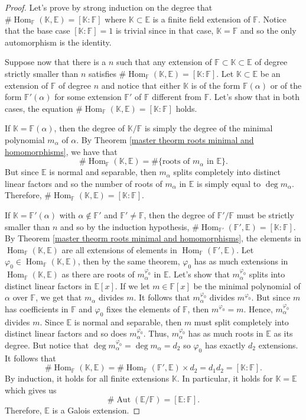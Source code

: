 \documentclass{article}
\theoremstyle{plain}
\theoremstyle{definition}
\newcommand{\F}{\mathbb{F}}
\newcommand{\E}{\mathbb{E}}
\newcommand{\K}{\mathbb{K}}
\DeclareMathOperator{\Aut}{Aut}
\DeclareMathOperator{\Hom}{Hom}
\begin{document}
\begin{proof}
    Let's prove by strong induction on the degree that $\# \Hom_{\F}(\K, \E) = [\K : \F]$ where $\K \subset \E$ is a finite field extension of $\F$. Notice that the base case $[\K : \F] = 1$ is trivial since in that case, $\K = \F$ and so the only automorphism is the identity. 
    
    Suppose now that there is a $n$ such that any extension of $\F \subset \K \subset \E$ of degree strictly smaller than $n$ satisfies $\# \Hom_{\F}(\K, \E) = [\K : \F]$. Let $\K \subset \E$ be an extension of $\F$ of degree $n$ and notice that either $\K$ is of the form $\F(\alpha)$ or of the form $\F'(\alpha)$ for some extension $\F'$ of $\F$ different from $\F$. Let's show that in both cases, the equation $\# \Hom_{\F}(\K, \E) = [\K : \F]$ holds.
    
    If $\K = \F(\alpha)$, then the degree of $\K / \F$ is simply the degree of the minimal polynomial $m_{\alpha}$ of $\alpha$. By Theorem \ref{master theorm roots minimal and homomorphisms}, we have that 
    $$\# \Hom_{\F}(\K, \E) = \#\{\text{roots of } m_{\alpha} \text{ in } \E\}.$$
    But since $\E$ is normal and separable, then $m_{\alpha}$ splits completely into distinct linear factors and so the number of roots of $m_{\alpha}$ in $\E$ is simply equal to $\deg m_{\alpha}$. Therefore, $\# \Hom_{\F}(\K, \E) = [\K : \F]$.

    If $\K = \F'(\alpha)$ with $\alpha \notin \F'$ and $\F' \neq \F$, then the degree of $\F'/\F$ must be strictly smaller than $n$ and so by the induction hypothesis, $\# \Hom_{\F'}(\F', \E) = [\K : \F]$. By Theorem \ref{master theorm roots minimal and homomorphisms}, the elements in $\Hom_{\F}(\K, \E)$ are all extensions of elements in $\Hom_{\F}(\F', \E)$. Let $\varphi_0 \in \Hom_{\F}(\K, \E)$, then by the same theorem, $\varphi_0$ has as much extensions in $\Hom_{\F}(\K, \E)$ as there are roots of $m_{\alpha}^{\varphi_0}$ in $\E$. Let's show that $m_{\alpha}^{\varphi_0}$ splits into distinct linear factors in $\E[x]$. If we let $m \in \F[x]$ be the minimal polynomial of $\alpha$ over $\F$, we get that $m_{\alpha}$ divides $m$. It follows that $m_{\alpha}^{\varphi_0}$ divides $m^{\varphi_0}$. But since $m$ has coefficients in $\F$ and $\varphi_0$ fixes the elements of $\F$, then $m^{\varphi_0} = m$. Hence, $m_{\alpha}^{\varphi_0}$ divides $m$. Since $\E$ is normal and separable, then $m$ must split completely into distinct linear factors and so does $m_{\alpha}^{\varphi_0}$. Thus, $m_{\alpha}^{\varphi_0}$ has as much roots in $\E$ as its degree. But notice that $\deg m_{\alpha}^{\varphi_0} = \deg m_{\alpha} = d_2$ so $\varphi_0$ has exactly $d_2$ extensions. It follows that 
    $$\#\Hom_{\F}(\K, \E) = \#\Hom_{\F}(\F', \E) \times d_2 = d_1 d_2 = [\K : \F].$$
    By induction, it holds for all finite extensions $\K$. In particular, it holds for $\K = \E$ which gives us 
    $$\#\Aut(\E / \F) = [\E : \F].$$ 
    Therefore, $\E$ is a Galois extension.
\end{proof}
\end{document}
